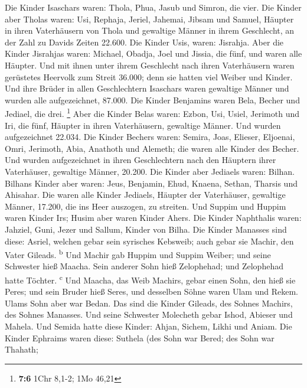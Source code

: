  Die Kinder Isaschars waren: Thola, Phua, Jasub und
Simron, die vier.  Die Kinder aber Tholas waren: Usi,
Rephaja, Jeriel, Jahemai, Jibsam und Samuel, Häupter in ihren
Vaterhäusern von Thola und gewaltige Männer in ihrem Geschlecht, an der
Zahl zu Davids Zeiten 22.600.  Die Kinder Usis, waren:
Jisrahja. Aber die Kinder Jisrahjas waren: Michael, Obadja, Joel und
Jissia, die fünf, und waren alle Häupter.  Und mit ihnen
unter ihrem Geschlecht nach ihren Vaterhäusern waren gerüstetes Heervolk
zum Streit 36.000; denn sie hatten viel Weiber und Kinder.
 Und ihre Brüder in allen Geschlechtern Isaschars waren
gewaltige Männer und wurden alle aufgezeichnet, 87.000. 
Die Kinder Benjamins waren Bela, Becher und Jediael, die drei.
\footnote{\textbf{7:6} 1Chr 8,1-2; 1Mo 46,21}  Aber die
Kinder Belas waren: Ezbon, Usi, Usiel, Jerimoth und Iri, die fünf,
Häupter in ihren Vaterhäusern, gewaltige Männer. Und wurden
aufgezeichnet 22.034.  Die Kinder Bechers waren: Semira,
Joas, Elieser, Eljoenai, Omri, Jerimoth, Abia, Anathoth und Alemeth; die
waren alle Kinder des Becher.  Und wurden aufgezeichnet in
ihren Geschlechtern nach den Häuptern ihrer Vaterhäuser, gewaltige
Männer, 20.200.  Die Kinder aber Jediaels waren: Bilhan.
Bilhans Kinder aber waren: Jeus, Benjamin, Ehud, Knaena, Sethan, Tharsis
und Ahisahar.  Die waren alle Kinder Jediaels, Häupter
der Vaterhäuser, gewaltige Männer, 17.200, die ins Heer auszogen, zu
streiten.  Und Suppim und Huppim waren Kinder Irs; Husim
aber waren Kinder Ahers.  Die Kinder Naphthalis waren:
Jahziel, Guni, Jezer und Sallum, Kinder von Bilha.  Die
Kinder Manasses sind diese: Asriel, welchen gebar sein syrisches
Kebsweib; auch gebar sie Machir, den Vater Gileads. \textsuperscript{b}
 Und Machir gab Huppim und Suppim Weiber; und seine
Schwester hieß Maacha. Sein anderer Sohn hieß Zelophehad; und Zelophehad
hatte Töchter. \textsuperscript{c}  Und Maacha, das Weib
Machirs, gebar einen Sohn, den hieß sie Peres; und sein Bruder hieß
Seres, und desselben Söhne waren Ulam und Rekem.  Ulams
Sohn aber war Bedan. Das sind die Kinder Gileads, des Sohnes Machirs,
des Sohnes Manasses.  Und seine Schwester Molecheth gebar
Ishod, Abieser und Mahela.  Und Semida hatte diese
Kinder: Ahjan, Sichem, Likhi und Aniam.  Die Kinder
Ephraims waren diese: Suthela (des Sohn war Bered; des Sohn war Thahath;
